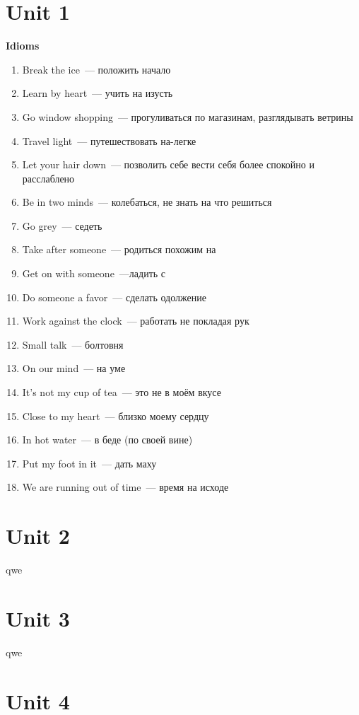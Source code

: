 \documentclass[10pt,a4paper]{article}
\begin{document}
\section{Unit 1}
\textbf{Idioms}

\begin{enumerate}
\itemsep -0.2em
 \item Break the ice~--- положить начало 
 \item Learn by heart~--- учить на изусть
 \item Go window shopping~--- прогуливаться по магазинам, разглядывать ветрины
 \item Travel light~--- путешествовать на-легке
 \item Let your hair down~--- позволить себе вести себя более спокойно и расслаблено
 \item Be in two minds~--- колебаться, не знать на что решиться
 \item Go grey~--- седеть
 \item Take after someone~--- родиться похожим на
 \item Get on with someone~---ладить с 
 \item Do someone a favor~--- сделать одолжение
 \item Work against the clock~--- работать не покладая рук
 \item Small talk~--- болтовня
 \item On our mind~--- на уме
 \item It's not my cup of tea~--- это не в моём вкусе
 \item Close to my heart~--- близко моему сердцу
 \item In hot water~--- в беде (по своей вине)
 \item Put my foot in it~--- дать маху
 \item We are running out of time~--- время на исходе
\end{enumerate}



\section{Unit 2}
qwe



\section{Unit 3}
qwe



\section{Unit 4}
\end{document}
